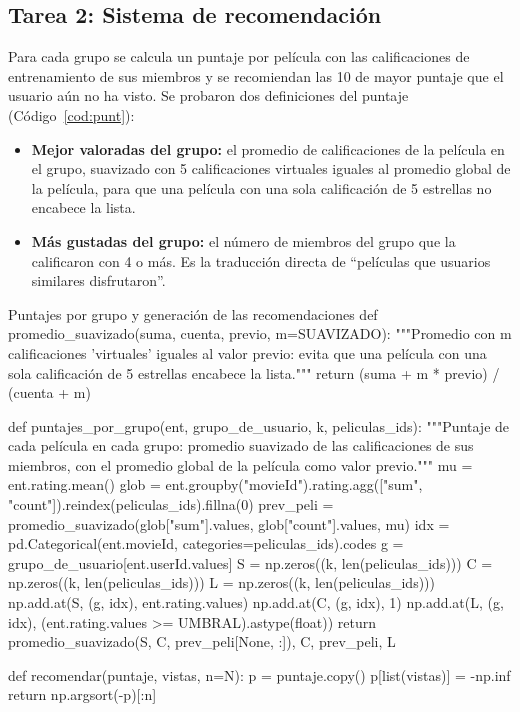 \documentclass[11pt,letterpaper]{article}
\begin{document}
\subsection{Tarea 2: Sistema de recomendación}

Para cada grupo se calcula un puntaje por película con las calificaciones de entrenamiento de sus miembros y se recomiendan las 10 de mayor puntaje que el usuario aún no ha visto. Se probaron dos definiciones del puntaje (Código~\ref{cod:punt}):
\begin{itemize}
    \item \textbf{Mejor valoradas del grupo:} el promedio de calificaciones de la película en el grupo, suavizado con 5 calificaciones virtuales iguales al promedio global de la película, para que una película con una sola calificación de 5 estrellas no encabece la lista.
    \item \textbf{Más gustadas del grupo:} el número de miembros del grupo que la calificaron con 4 o más. Es la traducción directa de ``películas que usuarios similares disfrutaron''.
\end{itemize}

\begin{codigo}[label=cod:punt]{Puntajes por grupo y generación de las recomendaciones}
def promedio_suavizado(suma, cuenta, previo, m=SUAVIZADO):
    """Promedio con m calificaciones 'virtuales' iguales al valor previo: evita que una película
    con una sola calificación de 5 estrellas encabece la lista."""
    return (suma + m * previo) / (cuenta + m)


def puntajes_por_grupo(ent, grupo_de_usuario, k, peliculas_ids):
    """Puntaje de cada película en cada grupo: promedio suavizado de las calificaciones de sus miembros,
    con el promedio global de la película como valor previo."""
    mu = ent.rating.mean()
    glob = ent.groupby("movieId").rating.agg(["sum", "count"]).reindex(peliculas_ids).fillna(0)
    prev_peli = promedio_suavizado(glob["sum"].values, glob["count"].values, mu)
    idx = pd.Categorical(ent.movieId, categories=peliculas_ids).codes
    g = grupo_de_usuario[ent.userId.values]
    S = np.zeros((k, len(peliculas_ids)))
    C = np.zeros((k, len(peliculas_ids)))
    L = np.zeros((k, len(peliculas_ids)))
    np.add.at(S, (g, idx), ent.rating.values)
    np.add.at(C, (g, idx), 1)
    np.add.at(L, (g, idx), (ent.rating.values >= UMBRAL).astype(float))
    return promedio_suavizado(S, C, prev_peli[None, :]), C, prev_peli, L


def recomendar(puntaje, vistas, n=N):
    p = puntaje.copy()
    p[list(vistas)] = -np.inf
    return np.argsort(-p)[:n]
\end{codigo}
\end{document}
